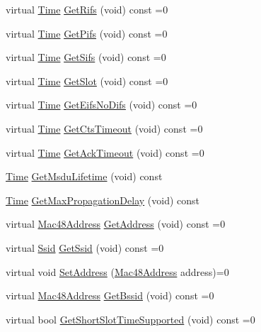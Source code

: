 \begin{DoxyCompactItemize}
virtual \hyperlink{classns3_1_1Time}{Time} \hyperlink{classns3_1_1WifiMac_a807f540d27ced3c3edfac7f9ee6efe9d}{Get\+Rifs} (void) const =0
\item 
virtual \hyperlink{classns3_1_1Time}{Time} \hyperlink{classns3_1_1WifiMac_abdcc09dccf8365715f5a2ecd534edea1}{Get\+Pifs} (void) const =0
\item 
virtual \hyperlink{classns3_1_1Time}{Time} \hyperlink{classns3_1_1WifiMac_ab6e55175c39884e7884b94a3514eb739}{Get\+Sifs} (void) const =0
\item 
virtual \hyperlink{classns3_1_1Time}{Time} \hyperlink{classns3_1_1WifiMac_a5055536fb58a64f43ccf6fa41702e3fd}{Get\+Slot} (void) const =0
\item 
virtual \hyperlink{classns3_1_1Time}{Time} \hyperlink{classns3_1_1WifiMac_ab113e24e9572c7314222389e487d1e78}{Get\+Eifs\+No\+Difs} (void) const =0
\item 
virtual \hyperlink{classns3_1_1Time}{Time} \hyperlink{classns3_1_1WifiMac_ab33eb66bc4a3c40cd48c38e9dc7cd3ee}{Get\+Cts\+Timeout} (void) const =0
\item 
virtual \hyperlink{classns3_1_1Time}{Time} \hyperlink{classns3_1_1WifiMac_a1a3e7634a7afef9741d253871ec93a7d}{Get\+Ack\+Timeout} (void) const =0
\item 
\hyperlink{classns3_1_1Time}{Time} \hyperlink{classns3_1_1WifiMac_adbdef3dd72c795f0627cfb92104dd04b}{Get\+Msdu\+Lifetime} (void) const 
\item 
\hyperlink{classns3_1_1Time}{Time} \hyperlink{classns3_1_1WifiMac_aae38cea8b33d9220b804e4b680be08d9}{Get\+Max\+Propagation\+Delay} (void) const 
\item 
virtual \hyperlink{classns3_1_1Mac48Address}{Mac48\+Address} \hyperlink{classns3_1_1WifiMac_a33fe07ddd3b87daa38d94a596cae9d30}{Get\+Address} (void) const =0
\item 
virtual \hyperlink{classns3_1_1Ssid}{Ssid} \hyperlink{classns3_1_1WifiMac_a7cced388e3d4aae6543daef8787c41a7}{Get\+Ssid} (void) const =0
\item 
virtual void \hyperlink{classns3_1_1WifiMac_acb910dff0196a6ddc27efd106efa1f3a}{Set\+Address} (\hyperlink{classns3_1_1Mac48Address}{Mac48\+Address} address)=0
\item 
virtual \hyperlink{classns3_1_1Mac48Address}{Mac48\+Address} \hyperlink{classns3_1_1WifiMac_a48c2fb002bc7f2a0aed0c57faca7cec3}{Get\+Bssid} (void) const =0
\item 
virtual bool \hyperlink{classns3_1_1WifiMac_ab6622407759ab8a472812a3a4167e3fb}{Get\+Short\+Slot\+Time\+Supported} (void) const =0

\end{DoxyCompactItemize}
